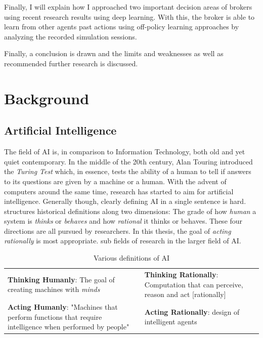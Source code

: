 Finally, I will explain how I approached two important decision areas of brokers using recent research results using
deep learning. With this, the broker is able to learn from other agents past actions using off-policy learning
approaches by analyzing the recorded simulation sessions. 

Finally, a conclusion is drawn and the limits and weaknesses as well as recommended further research is discussed.

\chapter{Background}

\section{Artificial Intelligence}%
\label{sec:artificial_intelligence}

The field of \ac {AI} is, in comparison to Information Technology, both old and yet quiet contemporary. In the middle of
the 20th century, Alan Touring introduced the \emph{Turing Test} which, in essence, tests the ability of a human to tell
if answers to its questions are given by a machine or a human. With the advent of computers around the same time,
research has started to aim for artificial intelligence. Generally though, clearly defining \ac {AI} in a single sentence is hard.
\citet{russell2016artificial} structures historical definitions along two dimensions: The grade of how \emph{human} a system is \emph{thinks} or
\emph{behaves} and how \emph{rational} it thinks or behaves. These four directions are all pursued by researchers. In
this thesis, the goal of \emph{acting rationally} is most appropriate. 
sub fields of research in the larger field of \ac {AI}. 

\begin{table}[] 
    \renewcommand{\arraystretch}{2.5}
    \centering
    \begin{tabular}{p{}|p{}} 
        \textbf{Thinking Humanly}: The goal of creating machines with \emph{minds}
&   
        \textbf{Thinking Rationally}: Computation that can perceive, reason and act [rationally]
\\
            \textbf{Acting Humanly}: "Machines that perform functions that require intelligence when performed by people"
&
        \textbf{Acting Rationally}:  design of intelligent agents
    \end{tabular}
    \caption{Various definitions of \ac {AI} \citep{russell2016artificial}  }
    \label{tab:ai_definitions}
\end{table}

